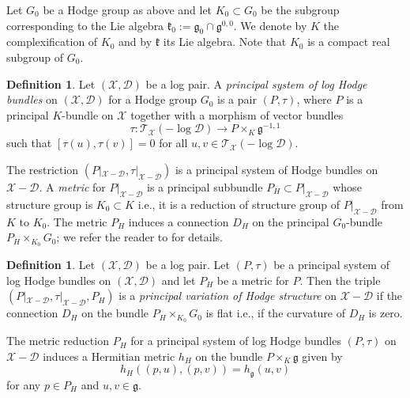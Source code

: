 \documentclass[a4paper]{amsart}
\theoremstyle{definition}
\newtheorem{definition}[theorem]{Definition}
\begin{document}
Let $G_0$ be a Hodge group as above and let $K_0\subset G_0$ be the subgroup corresponding to the Lie algebra $\mathfrak{k}_0:=\mathfrak{g}_0\cap\mathfrak{g}^{0,0}$. We denote by $K$ the complexification of $K_0$ and by $\mathfrak{k}$ its Lie algebra. Note that $K_0$ is a compact real subgroup of $G_0$. 


\begin{definition}\label{Principal hodge bundle}
Let $(\mathscr{X},\mathscr{D})$ be a log pair. A \emph{principal system of log Hodge bundles} on $(\mathscr{X},\mathscr{D})$ for a Hodge group $G_0$ is a pair $(P,\tau)$, where $P$ is a principal $K$-bundle on $\mathscr{X}$ together with a morphism of vector bundles
\[
\tau:\mathcal{T}_{\mathscr{X}}(-\log \mathscr{D})\to P\times_K\mathfrak{g}^{-1,1}
\]
such that $[\tau(u),\tau(v)]=0$ for all $u,v\in\mathcal{T}_{\mathscr{X}}(-\log \mathscr{D})$. 
\end{definition}

The restriction $(P|_{\mathscr{X}-\mathscr{D}},\tau|_{\mathscr{X}-\mathscr{D}})$ is a principal system of Hodge bundles on $\mathscr{X}-\mathscr{D}$. A \emph{metric} for $P|_{\mathscr{X}-\mathscr{D}}$ is a principal subbundle $P_H\subset P|_{\mathscr{X}-\mathscr{D}}$ whose structure group is $K_0\subset K$ i.e., it is a reduction of structure group of $P|_{\mathscr{X}-\mathscr{D}}$ from $K$ to $K_0$. The metric $P_H$ induces a connection $D_H$ on the principal $G_0$-bundle $P_H\times_{K_0}G_0$; we refer the reader to \cite[Definition 3.2]{dengcadorel} for details.

\begin{definition}\label{Principal VHS}
Let $(\mathscr{X},\mathscr{D})$ be a log pair. Let $(P,\tau)$ be a principal system of log Hodge bundles on $(\mathscr{X},\mathscr{D})$ and let $P_H$ be a metric for $P$. Then the triple $(P|_{\mathscr{X}-\mathscr{D}},\tau|_{\mathscr{X}-\mathscr{D}},P_H)$ is a \emph{principal variation of Hodge structure} on $\mathscr{X}-\mathscr{D}$ if the connection $D_H$ on the bundle $P_H\times_{K_0}G_0$ is flat i.e., if the curvature of $D_H$ is zero.
\end{definition}

The metric reduction $P_H$ for a principal system of log Hodge bundles $(P,\tau)$ on $\mathscr{X}-\mathscr{D}$ induces a Hermitian metric $h_H$ on the bundle $P\times_K\mathfrak{g}$ given by 
\[
h_H((p,u),(p,v))=h_{\mathfrak{g}}(u,v)
\]
for any $p\in P_H$ and $u,v\in\mathfrak{g}$.
\end{document}
